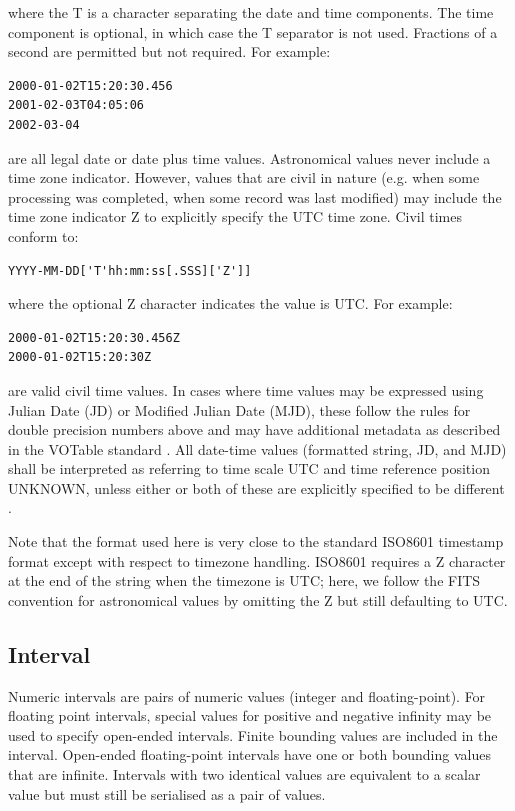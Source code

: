 \documentclass[11pt,letter]{ivoa}
\begin{document}
\noindent
where the T is a character separating the date and time components. The time
component is optional, in which case the T separator is not used. Fractions of a
second are permitted but not required. For example:

\begin{verbatim}
2000-01-02T15:20:30.456
2001-02-03T04:05:06
2002-03-04
\end{verbatim}

\noindent
are all legal date or date plus time values. Astronomical values never
include a time zone indicator. However, values that
are civil in nature (e.g. when some processing was completed, when some record
was last modified) may include the time zone indicator Z to explicitly specify
the UTC time zone. Civil times conform to:

\begin{verbatim}
YYYY-MM-DD['T'hh:mm:ss[.SSS]['Z']]
\end{verbatim}

\noindent
where the optional Z character indicates the value is UTC. For example:

\begin{verbatim}
2000-01-02T15:20:30.456Z
2000-01-02T15:20:30Z
\end{verbatim}

\noindent
are valid civil time values. In cases where time values may be
expressed using Julian Date (JD) or Modified Julian Date (MJD), these follow the
rules for double precision numbers above and may have additional metadata as
described in the VOTable standard \citep{2019ivoa.spec.1021O}. All date-time values (formatted string, JD,
and MJD) shall be interpreted as referring to time scale UTC and time reference
position UNKNOWN, unless either or both of these are explicitly specified to be
different \citep{2007ivoa.spec.1030R}.

Note that the format used here is very close to the standard ISO8601 timestamp
format except with respect to timezone handling. ISO8601 requires a Z character
at the end of the string when the timezone is UTC; here, we follow the FITS
\citep{std:FITS} convention for astronomical values by omitting the Z but still
defaulting to UTC.

\subsection{Interval}
Numeric intervals are pairs of numeric values (integer and floating-point). For floating point
intervals, special values for positive and negative infinity may be used to specify open-ended intervals.
Finite bounding values are included in the interval. Open-ended floating-point
intervals have one or both bounding values that are infinite. Intervals with two identical values
are equivalent to a scalar value but must still be serialised as a pair of values.
\end{document}

